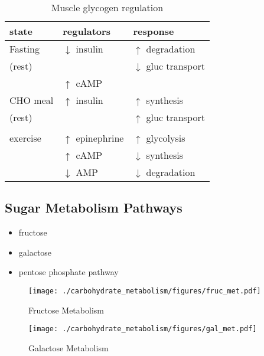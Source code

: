 \documentclass{scrartcl}
\begin{document}
\begin{table}[htbp]
\caption{\label{tab:org0c6f87b}
Muscle glycogen regulation}
\centering
\begin{tabular}{lll}
state & regulators & response\\
\hline
Fasting & \(\downarrow\) insulin & \(\uparrow\) degradation\\
(rest) &  & \(\downarrow\) gluc transport\\
 & \(\uparrow\) cAMP & \\
CHO meal & \(\uparrow\) insulin & \(\uparrow\) synthesis\\
(rest) &  & \(\uparrow\) gluc transport\\
 &  & \\
exercise & \(\uparrow\) epinephrine & \(\uparrow\) glycolysis\\
 & \(\uparrow\) cAMP & \(\downarrow\) synthesis\\
 & \(\downarrow\) AMP & \(\downarrow\) degradation\\
\end{tabular}
\end{table}

\subsection{Sugar Metabolism Pathways}
\label{sec:org7e972ac}
\begin{itemize}
\item fructose
\item galactose
\item pentose phosphate pathway
\end{itemize}

\begin{figure}[htbp]
\centering
\texttt{[image: ./carbohydrate\_metabolism/figures/fruc\_met.pdf]}
\caption{\label{fig:orgfb35027}
Fructose Metabolism}
\end{figure}

\begin{figure}[htbp]
\centering
\texttt{[image: ./carbohydrate\_metabolism/figures/gal\_met.pdf]}
\caption{\label{fig:orgd36d49b}
Galactose Metabolism}
\end{figure}
\end{document}
